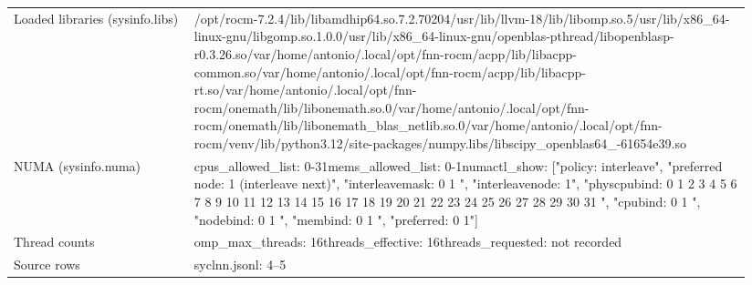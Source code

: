 \begin{longtable}{>{\raggedright\arraybackslash}p{0.23\linewidth}>{\raggedright\arraybackslash}p{0.71\linewidth}}
Loaded libraries (sysinfo.libs) & /\allowbreak{}opt/\allowbreak{}rocm-7.2.4/\allowbreak{}lib/\allowbreak{}libamdhip64.so.7.2.70204\newline /\allowbreak{}usr/\allowbreak{}lib/\allowbreak{}llvm-18/\allowbreak{}lib/\allowbreak{}libomp.so.5\newline /\allowbreak{}usr/\allowbreak{}lib/\allowbreak{}x86\_\allowbreak{}64-linux-gnu/\allowbreak{}libgomp.so.1.0.0\newline /\allowbreak{}usr/\allowbreak{}lib/\allowbreak{}x86\_\allowbreak{}64-linux-gnu/\allowbreak{}openblas-pthread/\allowbreak{}libopenblasp-r0.3.26.so\newline /\allowbreak{}var/\allowbreak{}home/\allowbreak{}antonio/\allowbreak{}.local/\allowbreak{}opt/\allowbreak{}fnn-rocm/\allowbreak{}acpp/\allowbreak{}lib/\allowbreak{}libacpp-common.so\newline /\allowbreak{}var/\allowbreak{}home/\allowbreak{}antonio/\allowbreak{}.local/\allowbreak{}opt/\allowbreak{}fnn-rocm/\allowbreak{}acpp/\allowbreak{}lib/\allowbreak{}libacpp-rt.so\newline /\allowbreak{}var/\allowbreak{}home/\allowbreak{}antonio/\allowbreak{}.local/\allowbreak{}opt/\allowbreak{}fnn-rocm/\allowbreak{}onemath/\allowbreak{}lib/\allowbreak{}libonemath.so.0\newline /\allowbreak{}var/\allowbreak{}home/\allowbreak{}antonio/\allowbreak{}.local/\allowbreak{}opt/\allowbreak{}fnn-rocm/\allowbreak{}onemath/\allowbreak{}lib/\allowbreak{}libonemath\_\allowbreak{}blas\_\allowbreak{}netlib.so.0\newline /\allowbreak{}var/\allowbreak{}home/\allowbreak{}antonio/\allowbreak{}.local/\allowbreak{}opt/\allowbreak{}fnn-rocm/\allowbreak{}venv/\allowbreak{}lib/\allowbreak{}python3.12/\allowbreak{}site-packages/\allowbreak{}numpy.libs/\allowbreak{}libscipy\_\allowbreak{}openblas64\_\allowbreak{}-61654e39.so \\
NUMA (sysinfo.numa) & cpus\_\allowbreak{}allowed\_\allowbreak{}list: 0-31\newline mems\_\allowbreak{}allowed\_\allowbreak{}list: 0-1\newline numactl\_\allowbreak{}show: ["policy: interleave", "preferred node: 1 (interleave next)", "interleavemask: 0 1 ", "interleavenode: 1", "physcpubind: 0 1 2 3 4 5 6 7 8 9 10 11 12 13 14 15 16 17 18 19 20 21 22 23 24 25 26 27 28 29 30 31 ", "cpubind: 0 1 ", "nodebind: 0 1 ", "membind: 0 1 ", "preferred: 0 1"] \\
Thread counts & omp\_\allowbreak{}max\_\allowbreak{}threads: 16\newline threads\_\allowbreak{}effective: 16\newline threads\_\allowbreak{}requested: not recorded \\
Source rows & syclnn.jsonl: 4–5 \\
\end{longtable}
